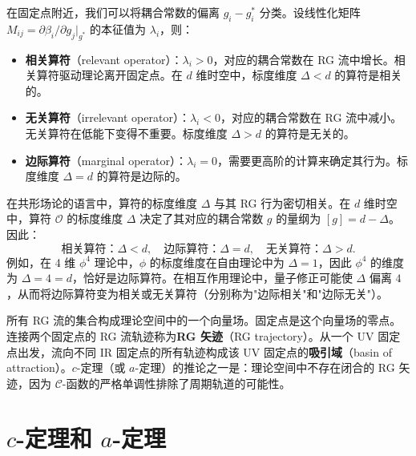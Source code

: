 \begin{property}\label{prop:relevance}
在固定点附近，我们可以将耦合常数的偏离 $g_i - g_i^*$ 分类。设线性化矩阵 $M_{ij} = \partial\beta_i/\partial g_j\big|_{g^*}$ 的本征值为 $\lambda_i$，则：
\begin{itemize}
    \item \textbf{相关算符}（relevant operator）：$\lambda_i > 0$，对应的耦合常数在 RG 流中增长。相关算符驱动理论离开固定点。在 $d$ 维时空中，标度维度 $\Delta < d$ 的算符是相关的。
    \item \textbf{无关算符}（irrelevant operator）：$\lambda_i < 0$，对应的耦合常数在 RG 流中减小。无关算符在低能下变得不重要。标度维度 $\Delta > d$ 的算符是无关的。
    \item \textbf{边际算符}（marginal operator）：$\lambda_i = 0$，需要更高阶的计算来确定其行为。标度维度 $\Delta = d$ 的算符是边际的。
\end{itemize}
\end{property}

\begin{remark}
在共形场论的语言中，算符的标度维度 $\Delta$ 与其 RG 行为密切相关。在 $d$ 维时空中，算符 $\mathcal{O}$ 的标度维度 $\Delta$ 决定了其对应的耦合常数 $g$ 的量纲为 $[g] = d - \Delta$。因此：
\begin{equation}
    \text{相关算符：}\Delta < d, \quad \text{边际算符：}\Delta = d, \quad \text{无关算符：}\Delta > d.
\end{equation}
例如，在 4 维 $\phi^4$ 理论中，$\phi$ 的标度维度在自由理论中为 $\Delta = 1$，因此 $\phi^4$ 的维度为 $\Delta = 4 = d$，恰好是边际算符。在相互作用理论中，量子修正可能使 $\Delta$ 偏离 $4$，从而将边际算符变为相关或无关算符（分别称为"边际相关"和"边际无关"）。
\end{remark}

\begin{definition}[RG 流的拓扑结构]\label{def:rg_topology}
所有 RG 流的集合构成理论空间中的一个向量场。固定点是这个向量场的零点。连接两个固定点的 RG 流轨迹称为\textbf{RG 矢迹}（RG trajectory）。从一个 UV 固定点出发，流向不同 IR 固定点的所有轨迹构成该 UV 固定点的\textbf{吸引域}（basin of attraction）。$c$-定理（或 $a$-定理）的推论之一是：理论空间中不存在闭合的 RG 矢迹，因为 $\mathcal{C}$-函数的严格单调性排除了周期轨道的可能性。
\end{definition}

\section{$c$-定理和 $a$-定理}

